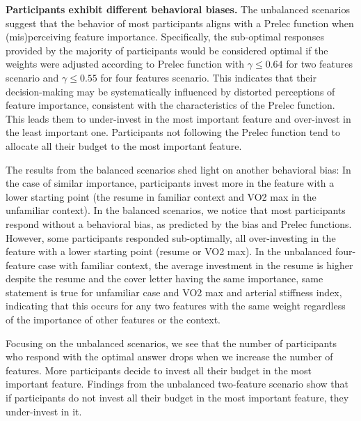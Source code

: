 \textbf{Participants exhibit different behavioral biases.} 
The unbalanced scenarios suggest that the behavior of most participants aligns with a Prelec function when (mis)perceiving feature importance. Specifically, the sub-optimal responses provided by the majority of participants would be considered optimal if the weights were adjusted according to Prelec function with $\gamma\le 0.64$ for two features scenario and $\gamma\le 0.55$ for four features scenario. This indicates that their decision-making may be systematically influenced by distorted perceptions of feature importance, consistent with the characteristics of the Prelec function. This leads them to under-invest in the most important feature and over-invest in the least important one. Participants not following the Prelec function tend to allocate all their budget to the most important feature.


The results from the balanced scenarios shed light on another behavioral bias: In the case of similar importance, participants invest more in the feature with a lower starting point (the resume in familiar context and VO2 max in the unfamiliar context). In the balanced scenarios, we notice that most participants respond without a behavioral bias, as predicted by the bias and Prelec functions. However, some participants responded sub-optimally, all over-investing in the feature with a lower starting point (resume or VO2 max). In the unbalanced four-feature case with familiar context, the average investment in the resume is higher despite the resume and the cover letter having the same importance, same statement is true for unfamiliar case and VO2 max and arterial stiffness index, indicating that this occurs for any two features with the same weight regardless of the importance of other features or the context. 

Focusing on the unbalanced scenarios, we see that the number of participants who respond with the optimal answer drops when we increase the number of features. More participants decide to invest all their budget in the most important feature. Findings from the unbalanced two-feature scenario show that if participants do not invest all their budget in the most important feature, they under-invest in it. 

